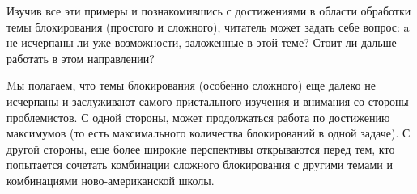 Изучив все эти примеры и познакомившись с достижениями в области обработки темы блокирования (простого и сложного), читатель может задать себе вопрос: a не исчерпаны ли уже возможности, заложенные в этой теме? Стоит ли дальше работать в этом направлении?

Mы полагаем, что темы блокирования (особенно сложного) еще далеко не исчерпаны и заслуживают самого пристального изучения и внимания со стороны проблемистов. С одной стороны, может продолжаться работа по достижению максимумов (то есть максимального количества блокирований в одной задаче). С другой стороны, еще более широкие перспективы открываются перед тем, кто попытается сочетать комбинации сложного блокирования с другими темами и комбинациями ново-американской школы.
